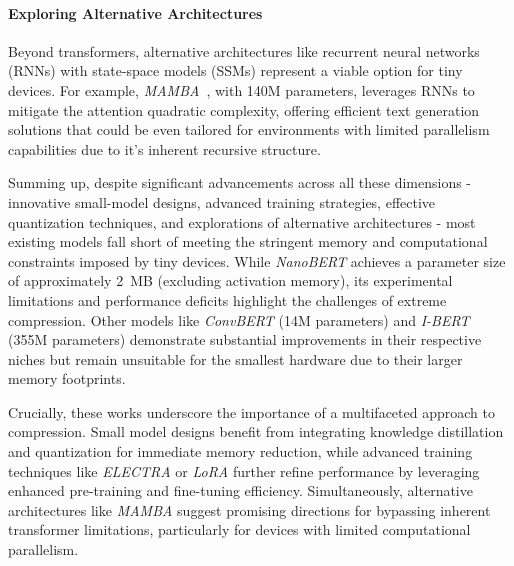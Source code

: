 \paragraph{Exploring Alternative Architectures} 
Beyond transformers, alternative architectures like recurrent neural networks (RNNs) with state-space models (SSMs) represent a viable option for tiny devices. For example, \textit{MAMBA}~\cite{MAMBA}, with 140M parameters, leverages RNNs to mitigate the attention quadratic complexity, offering efficient text generation solutions that could be even tailored for environments with limited parallelism capabilities due to it's inherent recursive structure.

\vspace{5mm}

Summing up, despite significant advancements across all these dimensions - innovative small-model designs, advanced training strategies, effective quantization techniques, and explorations of alternative architectures - most existing models fall short of meeting the stringent memory and computational constraints imposed by tiny devices. While \textit{NanoBERT} achieves a parameter size of approximately 2~MB (excluding activation memory), its experimental limitations and performance deficits highlight the challenges of extreme compression. Other models like \textit{ConvBERT} (14M parameters) and \textit{I-BERT} (355M parameters) demonstrate substantial improvements in their respective niches but remain unsuitable for the smallest hardware due to their larger memory footprints.

Crucially, these works underscore the importance of a multifaceted approach to compression. Small model designs benefit from integrating knowledge distillation and quantization for immediate memory reduction, while advanced training techniques like \textit{ELECTRA} or \textit{LoRA} further refine performance by leveraging enhanced pre-training and fine-tuning efficiency. Simultaneously, alternative architectures like \textit{MAMBA} suggest promising directions for bypassing inherent transformer limitations, particularly for devices with limited computational parallelism.

